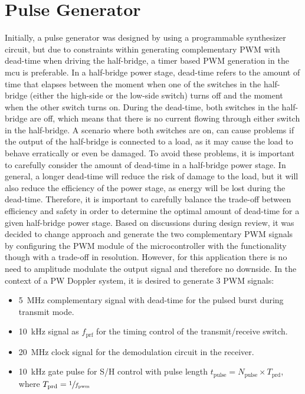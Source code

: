
\section{Pulse Generator}
Initially, a pulse generator was designed by using a programmable synthesizer circuit, but due to constraints within generating complementary PWM with dead-time when driving the half-bridge, a timer based PWM generation in the \gls{mcu} is preferable. In a half-bridge power stage, dead-time refers to the amount of time that elapses between the moment when one of the switches in the half-bridge (either the high-side or the low-side switch) turns off and the moment when the other switch turns on. During the dead-time, both switches in the half-bridge are off, which means that there is no current flowing through either switch in the half-bridge. A scenario where both switches are on, can cause problems if the output of the half-bridge is connected to a load, as it may cause the load to behave erratically or even be damaged. To avoid these problems, it is important to carefully consider the amount of dead-time in a half-bridge power stage. In general, a longer dead-time will reduce the risk of damage to the load, but it will also reduce the efficiency of the power stage, as energy will be lost during the dead-time. Therefore, it is important to carefully balance the trade-off between efficiency and safety in order to determine the optimal amount of dead-time for a given half-bridge power stage. Based on discussions during design review, it was decided to change approach and generate the two complementary PWM signals by configuring the PWM module of the microcontroller with the functionality though with a trade-off in resolution. However, for this application there is no need to amplitude modulate the output signal and therefore no downside.
In the context of a PW Doppler system, it is desired to generate 3 PWM signals:
\begin{itemize}
	\item \qty{5}{\mega\hertz} complementary signal with dead-time for the pulsed burst during transmit mode.
	\item \qty{10}{\kilo\hertz} signal as $f_{\mathrm{prf}}$ for the timing control of the transmit/receive switch.
	\item \qty{20}{\mega\hertz} clock signal for the demodulation circuit in the receiver.
	\item \qty{10}{\kilo\hertz} gate pulse for S/H control with pulse length $t_{\mathrm{pulse}} = N_{\mathrm{pulse}} \times T_{\mathrm{prd}}$, where $T_{\mathrm{prd}} = \sfrac{1}{f_{\mathrm{pwm}}}$
\end{itemize}

